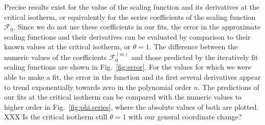 \documentclass[
aps,
pre,
preprint,
longbibliography,
floatfix
]{revtex4-2}
\begin{document}
Precise results exist for the value of the
scaling function and its derivatives at the critical isotherm, or equivalently
for the series coefficients of the scaling function $\mathcal F_0$. Since we do
not use these coefficients in our fits, the error in the approximate scaling
functions and their derivatives can be evaluated by comparison to their known
values at the critical isotherm, or $\theta=1$.
The difference between the numeric values of the coefficients $\mathcal
F_0^{(m)}$ and those predicted by the iteratively fit scaling functions are
shown in Fig.~\ref{fig:error}. For the values for which we were able to make a
fit, the error in the function and its first several derivatives appear to
trend exponentially towards zero in the polynomial order $n$. The predictions
of our fits at the critical isotherm can be compared with the numeric values to
higher order in Fig.~\ref{fig:phi.series}, where the absolute values of both
are plotted. {\color{blue} XXX Is the critical isotherm still $\theta=1$ with our general coordinate change?}
\end{document}
